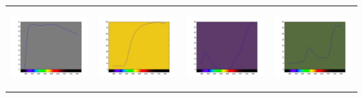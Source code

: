 \begin{tabular}{  c c c c }
\includegraphics[width=3.0cm,height=3.0cm]{ColorPaper/ch9.jpg}
&
\includegraphics[width=3.0cm,height=3.0cm]{ColorPaper/ch10.jpg}
&
\includegraphics[width=3.0cm,height=3.0cm]{ColorPaper/ch11.jpg}
&
\includegraphics[width=3.0cm,height=3.0cm]{ColorPaper/ch12.jpg}
\\


\end{tabular}
